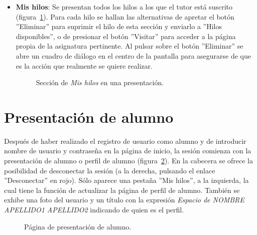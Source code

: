 \documentclass[a4paper, 12pt]{book}
\begin{document}
\begin{itemize}
  \item {\bfseries Mis hilos}: Se presentan todos los hilos a los que el tutor est\'a suscrito (figura~\ref{figura:tutor3}). Para cada hilo se hallan las 
  alternativas de apretar el bot\'on ''Eliminar'' para suprimir el hilo de esta secci\'on y enviarlo a ''Hilos disponibles'', o de presionar el bot\'on
  ''Visitar'' para acceder a la p\'agina propia de la asignatura pertinente. Al pulsar sobre el bot\'on ''Eliminar'' se abre un cuadro de di\'alogo en el 
  centro de la pantalla para asegurarse de que es la acci\'on que realmente se quiere realizar.
  \begin{figure}[htbp] 
    \centering
    \caption{Secci\'on de \textit{Mis hilos} en una presentaci\'on.}
    \label{figura:tutor3}
  \end{figure}
\end{itemize} 


\section{Presentaci\'on de alumno}
\label{app:presentacionalumno}
Despu\'es de haber realizado el registro de usuario como alumno y de introducir nombre de usuario y contrase\~na en la p\'agina de inicio, la sesi\'on 
comienza con la presentaci\'on de alumno o perfil de alumno (figura~\ref{figura:alumno}). En la cabecera se ofrece la posibilidad de desconectar la sesi\'on 
(a la derecha, pulsando el enlace ''Desconectar'' en rojo). S\'olo aparece una pesta\~na ''Mis hilos'', a la izquierda, la cual tiene la funci\'on de 
actualizar la p\'agina de perfil de alumno. Tambi\'en se exhibe una foto del usuario y un t\'itulo con la expresi\'on 
\textit{Espacio de NOMBRE APELLIDO1 APELLIDO2} indicando de quien es el perfil.

\begin{figure}[htbp] 
  \centering
  \caption{P\'agina de presentaci\'on de alumno.}
  \label{figura:alumno}
\end{figure}
\end{document}
